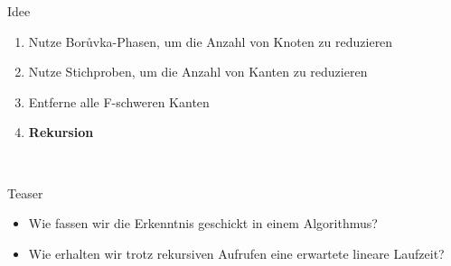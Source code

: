 \documentclass[10pt]{beamer}
\begin{document}
\begin{frame}{Idee}
    \begin{enumerate}
        \item Nutze Bor\r uvka-Phasen, um die Anzahl von Knoten zu reduzieren
        \item Nutze Stichproben, um die Anzahl von Kanten zu reduzieren
        \item Entferne alle F-schweren Kanten
        \item \textbf{Rekursion}
    \end{enumerate}\\
\end{frame}
\begin{frame}{Teaser}
    \begin{itemize}
        \item Wie fassen wir die Erkenntnis geschickt in einem Algorithmus?
        \item Wie erhalten wir trotz rekursiven Aufrufen eine erwartete lineare
              Laufzeit?
    \end{itemize}
\end{frame}
\end{document}
